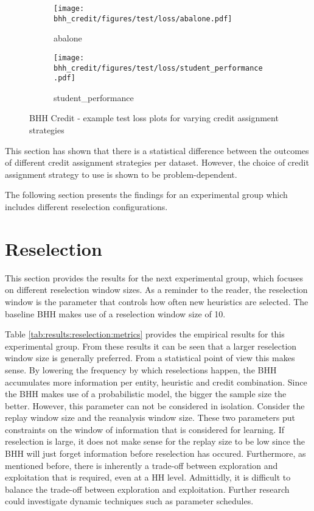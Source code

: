 \begin{figure}[htbp]
      \begin{subfigure}{0.5\textwidth}
            \centering
            \texttt{[image: bhh\_credit/figures/test/loss/abalone.pdf]}
            \caption{abalone}
            \label{fig:results:credit:figures:loss1}
      \end{subfigure}
      \begin{subfigure}{0.5\textwidth}
            \centering
            \texttt{[image: bhh\_credit/figures/test/loss/student\_performance.pdf]}
            \caption{student\_performance}
            \label{fig:results:credit:figures:loss2}
      \end{subfigure}
      \caption{\Acs{BHH} Credit - example test loss plots for varying credit assignment strategies}
      \label{fig:results:credit:figures:loss}
\end{figure}


This section has shown that there is a statistical difference between the outcomes of different credit assignment strategies per dataset. However, the choice of credit assignment strategy to use is shown to be problem-dependent.

The following section presents the findings for an experimental group which includes different reselection configurations.





\section{Reselection}
\label{sec:results:reselection}

This section provides the results for the next experimental group, which focuses on different reselection window sizes. As a reminder to the reader, the reselection window is the parameter that controls how often new heuristics are selected. The baseline \Ac{BHH} makes use of a reselection window size of 10.

Table \ref{tab:results:reselection:metrics} provides the empirical results for this experimental group. From these results it can be seen that a larger reselection window size is generally preferred. From a statistical point of view this makes sense. By lowering the frequency by which reselections happen, the \Ac{BHH} accumulates more information per entity, heuristic and credit combination. Since the \Ac{BHH} makes use of a probabilistic model, the bigger the sample size the better. However, this parameter can not be considered in isolation. Consider the replay window size and the reanalysis window size. These two parameters put constraints on the window of information that is considered for learning. If reselection is large, it does not make sense for the replay size to be low since the \Ac{BHH} will just forget information before reselection has occured. Furthermore, as mentioned before, there is inherently a trade-off between exploration and exploitation that is required, even at a \ac{HH} level. Admittidly, it is difficult to balance the trade-off between exploration and exploitation. Further research could investigate dynamic techniques such as parameter schedules.

